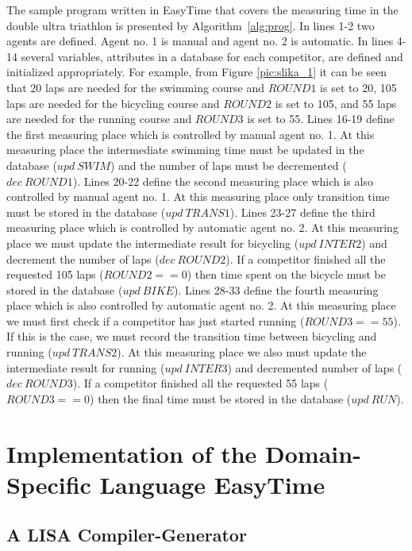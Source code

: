 \documentclass[preprint, prX]{revtex4}
\begin{document}
The sample program written in EasyTime that covers the measuring time in the double ultra triathlon is presented by Algorithm~\ref{alg:prog}. In lines 1-2 two agents are defined. Agent no. 1 is manual and agent no. 2 is automatic. In lines 4-14 several variables, attributes in a database for each competitor, are defined and initialized appropriately. For example, from Figure \ref{pic:slika_1} it can be seen that 20 laps are needed for the swimming course and $ROUND1$ is set to 20, 105 laps are needed for the bicycling course and $ROUND2$ is set to 105, and 55 laps are needed for the running course and $ROUND3$ is set to 55. Lines 16-19 define the first measuring place which is controlled by manual agent no. 1. At this measuring place the intermediate swimming time must be updated in the database ($upd~SWIM$) and the number of laps must be decremented ($dec~ROUND1$). Lines 20-22 define the second measuring place which is also controlled by manual agent no. 1. At this measuring place only transition time must be stored in the database ($upd~TRANS1$). Lines 23-27 define the third measuring place which is controlled by automatic agent no. 2. At this measuring place we must update the intermediate result for bicycling ($upd~INTER2$) and decrement the number of laps ($dec~ROUND2$). If a competitor finished all the requested 105 laps ($ROUND2==0$) then time spent on the bicycle must be stored in the database ($upd~BIKE$). Lines 28-33 define the fourth measuring place which is also controlled by automatic agent no. 2. At this measuring place we must first check if a competitor has just started running ($ROUND3==55$). If this is the case, we must record the transition time between bicycling and running ($upd~TRANS2$). At this measuring place we also must update the intermediate result for running ($upd~INTER3$) and decremented number of laps ($dec~ROUND3$). If a competitor finished all the requested 55 laps ($ROUND3==0$) then the final time must be stored in the database ($upd~RUN$).


\section{Implementation of the Domain-Specific Language EasyTime}

\subsection {A LISA Compiler-Generator}
\end{document}
